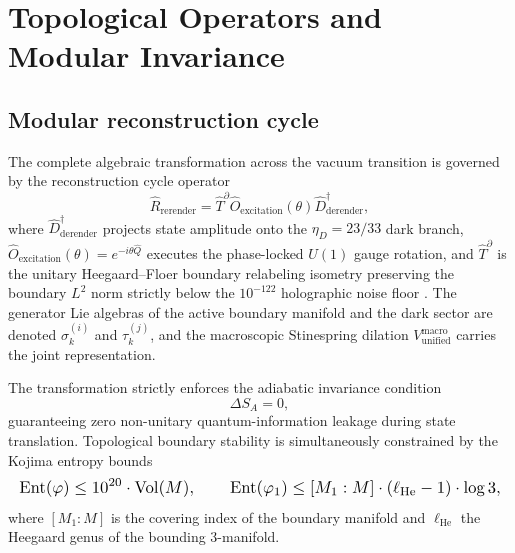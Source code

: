 \documentclass[10pt,journal,compsoc]{IEEEtran}
\begin{document}
\section{Topological Operators and Modular Invariance}
\subsection{Modular reconstruction cycle}
The complete algebraic transformation across the vacuum transition is
governed by the reconstruction cycle operator
\begin{equation}
\hat{R}_{\mathrm{rerender}} = \hat{T}^{\partial}
  \hat{O}_{\mathrm{excitation}}(\theta)\hat{D}_{\mathrm{derender}}^{\dagger},
\label{eq:rerender}
\end{equation}
where $\hat{D}_{\mathrm{derender}}^{\dagger}$ projects state amplitude onto
the $\eta_D = 23/33$ dark branch,
$\hat{O}_{\mathrm{excitation}}(\theta) = e^{-i\theta\hat{Q}}$ executes the
phase-locked $U(1)$ gauge rotation, and $\hat{T}^{\partial}$ is the unitary
Heegaard--Floer boundary relabeling isometry preserving the boundary $L^2$
norm strictly below the $10^{-122}$ holographic noise floor
\cite{sys1own_shbt2026}. The generator Lie algebras of the active boundary
manifold and the dark sector are denoted $\sigma_k^{(i)}$ and
$\tau_k^{(j)}$, and the macroscopic Stinespring dilation
$V_{\mathrm{unified}}^{\mathrm{macro}}$ carries the joint representation.

The transformation strictly enforces the adiabatic invariance condition
\begin{equation}
\Delta S_A = 0,
\label{eq:adiabatic}
\end{equation}
guaranteeing zero non-unitary quantum-information leakage during state
translation. Topological boundary stability is simultaneously constrained
by the Kojima entropy bounds
\begin{equation}\resizebox{\columnwidth}{!}{$\displaystyle
\mathrm{Ent}(\varphi) \le 10^{20}\cdot\mathrm{Vol}(M),
\qquad
\mathrm{Ent}(\varphi_1) \le [M_1:M]\cdot(\ell_{\mathrm{He}}-1)\cdot\log 3,
\label{eq:kojima}
$}\end{equation}
where $[M_1:M]$ is the covering index of the boundary manifold and
$\ell_{\mathrm{He}}$ the Heegaard genus of the bounding 3-manifold.
\end{document}
